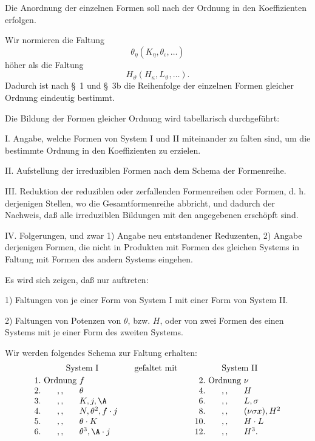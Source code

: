 Die Anordnung der einzelnen Formen soll nach der Ordnung in den Koeffizienten erfolgen.

Wir normieren die Faltung
\[
\theta_\eta(K_\eta,\theta_\iota,\ldots)
\]
höher als die Faltung
\[
H_\vartheta(H_\kappa,L_\vartheta,\ldots).
\]
Dadurch ist nach \S\ 1 und \S\ 3b die Reihenfolge der einzelnen Formen gleicher Ordnung eindeutig bestimmt.

Die Bildung der Formen gleicher Ordnung wird tabellarisch durchgeführt:

I. Angabe, welche Formen von System I und II miteinander zu falten sind, um die bestimmte Ordnung in den Koeffizienten zu erzielen.

II. Aufstellung der irreduziblen Formen nach dem Schema der Formenreihe.

III. Reduktion der reduziblen oder zerfallenden Formenreihen oder Formen, d. h. derjenigen Stellen, wo die Gesamtformenreihe abbricht, und dadurch der Nachweis, daß alle irreduziblen Bildungen mit den angegebenen erschöpft sind.

IV. Folgerungen, und zwar 1) Angabe neu entstandener Reduzenten, 2) Angabe derjenigen Formen, die nicht in Produkten mit Formen des gleichen Systems in Faltung mit Formen des andern Systems eingehen.

Es wird sich zeigen, daß nur auftreten:

1) Faltungen von je einer Form von System I mit einer Form von System II.

2) Faltungen von Potenzen von $\theta$, bzw. $H$, oder von zwei Formen des einen Systems mit je einer Form des zweiten Systems.

Wir werden folgendes Schema zur Faltung erhalten:
\[
\begin{array}{r@{\ }c@{\ }l@{\qquad}c@{\qquad}r@{\ }c@{\ }l}
\multicolumn{3}{c}{\text{System I}} & \text{gefaltet mit} & \multicolumn{3}{c}{\text{System II}}\\[0.25em]
1. & \text{Ordnung} & f & & 2. & \text{Ordnung} & \nu\\
2. & ,, & \theta & & 4. & ,, & H\\
3. & ,, & K,j,\A & & 6. & ,, & L,\sigma\\
4. & ,, & N,\theta^2,f\cdot j & & 8. & ,, & (\nu\sigma x),H^2\\
5. & ,, & \theta\cdot K & & 10. & ,, & H\cdot L\\
6. & ,, & \theta^3,\A\cdot j & & 12. & ,, & H^3.
\end{array}
\]

